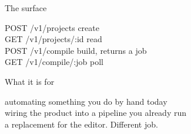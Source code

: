 \begin{frame}{The surface}
  \begin{console}
  POST /v1/projects        create\\
  GET  /v1/projects/:id    read\\
  POST /v1/compile         build, returns a job\\
  GET  /v1/compile/:job    poll
  \end{console}
\end{frame}

\begin{frame}{What it is for}
  \begin{console}
   automating something you do by hand today\\
   wiring the product into a pipeline you already run\\
   a replacement for the editor. Different job.
  \end{console}
\end{frame}
